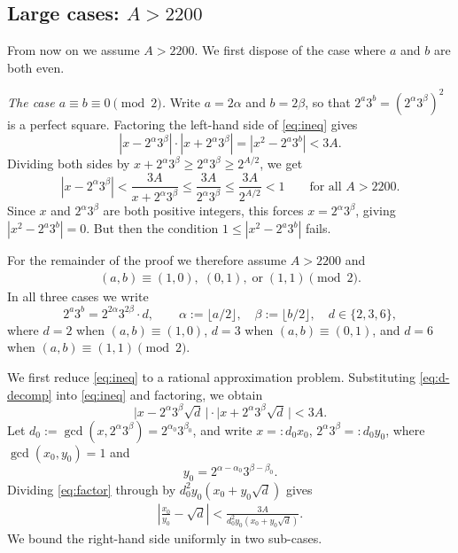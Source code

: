 \documentclass[11pt,a4paper]{article}
\numberwithin{equation}{section}
\numberwithin{table}{section}
\numberwithin{figure}{section}
\begin{document}
\subsection{Large cases: $A > 2200$}\label{sec:large}

From now on we assume $A > 2200$. We first dispose of the case where $a$ and $b$ are both even.

\medskip

\textit{The case $a \equiv b \equiv 0\pmod{2}$.}
Write $a = 2\alpha$ and $b = 2\beta$, so that $2^a 3^b = (2^\alpha 3^\beta)^2$ is a perfect square. Factoring the left-hand side of \eqref{eq:ineq} gives
\begin{equation*}
	|x - 2^\alpha 3^\beta|\cdot|x + 2^\alpha 3^\beta|
	= |x^2 - 2^a 3^b| < 3A.
\end{equation*}
Dividing both sides by $x + 2^\alpha 3^\beta \geq 2^\alpha 3^\beta \geq 2^{A/2}$, we get
\begin{equation*}
	|x - 2^\alpha 3^\beta|
	< \frac{3A}{x + 2^\alpha 3^\beta}
	\leq \frac{3A}{2^\alpha 3^\beta}
	\leq \frac{3A}{2^{A/2}} < 1
	\qquad\text{for all } A > 2200.
\end{equation*}
Since $x$ and $2^\alpha 3^\beta$ are both positive integers, this forces $x = 2^\alpha 3^\beta$, giving $|x^2 - 2^a 3^b| = 0$. But then the condition $1 \leq |x^2 - 2^a 3^b|$ fails. 
\medskip

For the remainder of the proof we therefore assume $A > 2200$ and
\begin{align*}
	(a,b) \equiv (1,0),\; (0,1),\; \text{or}\; (1,1) \pmod{2}.
\end{align*}
In all three cases we write
\begin{equation}\label{eq:d-decomp}
	2^a 3^b = 2^{2\alpha} 3^{2\beta} \cdot d,
	\qquad
	\alpha := \lfloor a/2 \rfloor,\quad
	\beta  := \lfloor b/2 \rfloor,\quad
	d \in \{2, 3, 6\},
\end{equation}
where $d = 2$ when $(a,b)\equiv(1,0)$, $d=3$ when $(a,b)\equiv(0,1)$, and $d = 6$ when $(a,b)\equiv(1,1)\pmod{2}$.

\medskip

We first reduce \eqref{eq:ineq} to a rational approximation problem. Substituting \eqref{eq:d-decomp} into \eqref{eq:ineq} and factoring, we obtain
\begin{equation}\label{eq:factor}
	\lvert x - 2^{\alpha}3^{\beta}\sqrt{d}\,\rvert
	\cdot
	\lvert x + 2^{\alpha}3^{\beta}\sqrt{d}\,\rvert < 3A.
\end{equation}
Let $d_0 := \gcd(x, 2^{\alpha}3^{\beta}) = 2^{\alpha_0}3^{\beta_0}$,
and write $x =: d_0 x_0$, $2^{\alpha}3^{\beta} =: d_0 y_0$, where $\gcd(x_0, y_0) = 1$ and 
$$y_0 = 2^{\alpha-\alpha_0}3^{\beta-\beta_0}.$$
Dividing \eqref{eq:factor} through by $d_0^2 y_0(x_0 + y_0\sqrt{d})$ gives
\begin{align*}
	\left|\frac{x_0}{y_0} - \sqrt{d}\right|
	< \frac{3A}{d_0^2 y_0(x_0 + y_0\sqrt{d})}.
\end{align*}
We bound the right-hand side uniformly in two sub-cases.
\end{document}
